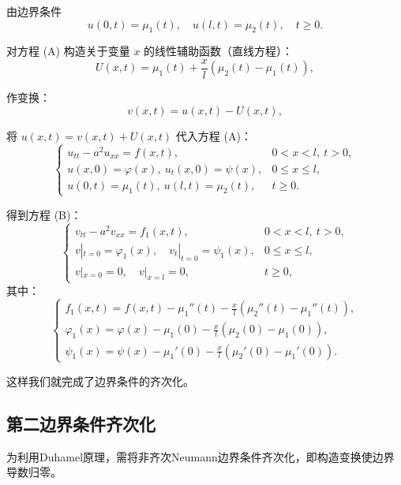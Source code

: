 \documentclass[12pt,a4paper]{article}
\numberwithin{subsection}{section}   %
\numberwithin{subsubsection}{subsection}
\theoremstyle{plain}
\theoremstyle{definition}
\theoremstyle{remark}
\theoremstyle{remark}
\begin{document}
	由边界条件
	\begin{equation}
		u(0,t) = \mu_1(t), \quad u(l,t) = \mu_2(t), \quad t \geq 0.
	\end{equation}
	
	对方程 (A) 构造关于变量 \(x\) 的线性辅助函数（直线方程）：
	\begin{equation}
		U(x, t) = \mu_1(t) + \frac{x}{l}(\mu_2(t) - \mu_1(t)),
	\end{equation}
	
	作变换：
	\begin{equation}
		v(x, t) = u(x, t) - U(x, t),
	\end{equation}
	
	将 \(u(x, t) = v(x, t) + U(x, t)\) 代入方程 (A)：
	\begin{equation}
		\begin{cases}
			u_{tt} - a^2 u_{xx} = f(x, t), & 0 < x < l, \ t > 0, \\
			u(x, 0) = \varphi(x), \ u_t(x, 0) = \psi(x), & 0 \leq x \leq l, \\
			u(0, t) = \mu_1(t), \ u(l, t) = \mu_2(t), & t \geq 0.
		\end{cases}
	\end{equation}
	
	得到方程 (B)：
	\begin{equation}\label{B}
		\begin{cases}
			v_{tt} - a^2 v_{xx} = f_1(x, t), & 0 < x < l, \ t > 0, \\
			v|_{t=0} = \varphi_1(x), \quad v_t|_{t=0} = \psi_1(x), & 0 \leq x \leq l, \\
			v|_{x=0} = 0, \quad v|_{x=l} = 0, & t \geq 0,
		\end{cases}
	\end{equation}
	其中：
	\begin{equation}
		\begin{cases}
			f_1(x, t) = f(x, t) - \mu_1''(t) - \frac{x}{l}(\mu_2''(t) - \mu_1''(t)), \\
			\varphi_1(x) = \varphi(x) - \mu_1(0) - \frac{x}{l}(\mu_2(0) - \mu_1(0)), \\
			\psi_1(x) = \psi(x) - \mu_1'(0) - \frac{x}{l}(\mu_2'(0) - \mu_1'(0)).
		\end{cases}
	\end{equation}
	
	这样我们就完成了边界条件的齐次化。
	
	\subsection{第二边界条件齐次化}
	为利用Duhamel原理，需将非齐次Neumann边界条件齐次化，即构造变换使边界导数归零。
\end{document}

